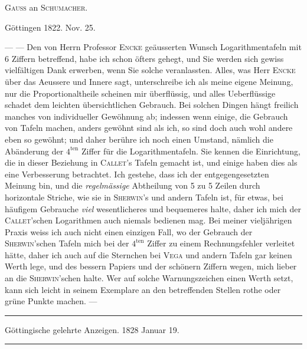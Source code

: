 \begin{center}
\textsc{Gauss} an \textsc{Schumacher}.
\end{center}
\begin{flushright}
Göttingen 1822. Nov. 25.
\end{flushright}
--- --- Den von Herrn Professor \textsc{Encke} geäusserten Wunsch Logarithmentafeln mit
6 Ziffern betreffend, habe ich schon öfters gehegt, und Sie werden sich gewiss
vielfältigen Dank erwerben, wenn Sie solche veranlassten. Alles, was Herr \textsc{Encke}
über das Aeussere und Innere sagt, unterschreibe ich als meine eigene Meinung,
nur die Proportionaltheile scheinen mir überflüssig, und alles Ueberflüssige schadet dem leichten übersichtlichen Gebrauch. Bei solchen Dingen hängt freilich
manches von individueller Gewöhnung ab; indessen wenn einige, die Gebrauch
von Tafeln machen, anders gewöhnt sind als ich, so sind doch auch wohl andere
eben so gewöhnt; und daher berühre ich noch einen Umstand, nämlich die Abänderung der \(4^{\mathrm{ten}}\) Ziffer für die Logarithmentafeln. Sie kennen die Einrichtung,
die in dieser Beziehung in \textsc{Callet}'s Tafeln gemacht ist, und einige haben dies als
eine Verbesserung betrachtet. Ich gestehe, dass ich der entgegengesetzten Meinung bin, und die \textit{regelmässige} Abtheilung von 5 zu 5 Zeilen durch horizontale
Striche, wie sie in \textsc{Sherwin}'s und andern Tafeln ist, für etwas, bei häufigem Gebrauche \textit{viel} wesentlicheres und bequemeres halte, daher ich mich der \textsc{Callet}'schen Logarithmen auch niemals bedienen mag. Bei meiner vieljährigen Praxis
weiss ich auch nicht einen einzigen Fall, wo der Gebrauch der \textsc{Sherwin}'schen Tafeln mich bei der \(4^{\mathrm{ten}}\) Ziffer zu einem Rechnungsfehler verleitet hätte, daher ich
auch auf die Sternchen bei \textsc{Vega} und andern Tafeln gar keinen Werth lege, und
des bessern Papiers und der schönern Ziffern wegen, mich lieber an die \textsc{Sherwin}'schen halte. Wer auf solche Warnungszeichen einen Werth setzt, kann sich
leicht in seinem Exemplare an den betreffenden Stellen rothe oder grüne Punkte
machen. ---
\clearpage{}
\par{}\begin{center}\rule{0.7\linewidth}{0.4pt}\par Göttingische gelehrte Anzeigen. 1828 Januar 19.\par\rule{0.7\linewidth}{0.4pt}\end{center}

